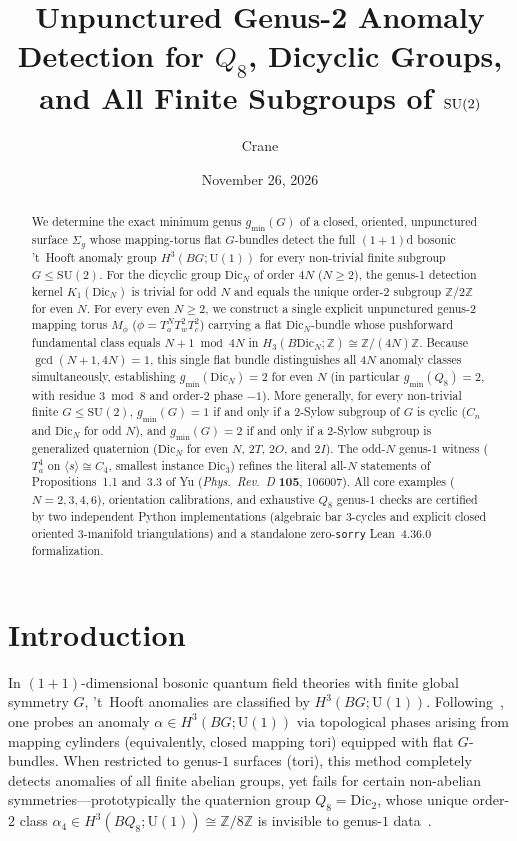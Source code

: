 \documentclass[11pt]{amsart}
\title[Unpunctured Genus-2 Anomaly Detection for Finite Subgroups of $\SU(2)$]{Unpunctured Genus-2 Anomaly Detection for $Q_8$, Dicyclic Groups, and All Finite Subgroups of $\SU(2)$}
\author{Crane}
\date{November 26, 2026}
\theoremstyle{definition}
\theoremstyle{remark}
\newcommand{\Z}{\mathbb{Z}}
\newcommand{\U}{\mathrm{U}}
\newcommand{\SU}{\mathrm{SU}}
\newcommand{\Dic}{\mathrm{Dic}}
\begin{document}
\begin{abstract}
We determine the exact minimum genus $g_{\min}(G)$ of a closed, oriented, unpunctured surface $\Sigma_g$ whose mapping-torus flat $G$-bundles detect the full $(1+1)$d bosonic 't~Hooft anomaly group $H^3(BG;\U(1))$ for every non-trivial finite subgroup $G \le \SU(2)$.
For the dicyclic group $\Dic_N$ of order $4N$ ($N \ge 2$), the genus-1 detection kernel $K_1(\Dic_N)$ is trivial for odd $N$ and equals the unique order-$2$ subgroup $\Z/2\Z$ for even $N$.
For every even $N \ge 2$, we construct a single explicit unpunctured genus-$2$ mapping torus $M_\phi$ ($\phi = T_a^N T_w^2 T_c^2$) carrying a flat $\Dic_N$-bundle whose pushforward fundamental class equals $N+1 \bmod 4N$ in $H_3(B\Dic_N;\Z) \cong \Z/(4N)\Z$.
Because $\gcd(N+1,4N)=1$, this single flat bundle distinguishes all $4N$ anomaly classes simultaneously, establishing $g_{\min}(\Dic_N)=2$ for even $N$ (in particular $g_{\min}(Q_8)=2$, with residue $3 \bmod 8$ and order-$2$ phase $-1$).
More generally, for every non-trivial finite $G \le \SU(2)$, $g_{\min}(G)=1$ if and only if a $2$-Sylow subgroup of $G$ is cyclic ($C_n$ and $\Dic_N$ for odd $N$), and $g_{\min}(G)=2$ if and only if a $2$-Sylow subgroup is generalized quaternion ($\Dic_N$ for even $N$, $2T$, $2O$, and $2I$).
The odd-$N$ genus-$1$ witness ($T_a^4$ on $\langle s\rangle \cong C_4$, smallest instance $\Dic_3$) refines the literal all-$N$ statements of Propositions~1.1 and~3.3 of Yu (\emph{Phys.\ Rev.\ D} \textbf{105}, 106007).
All core examples ($N=2,3,4,6$), orientation calibrations, and exhaustive $Q_8$ genus-$1$ checks are certified by two independent Python implementations (algebraic bar $3$-cycles and explicit closed oriented $3$-manifold triangulations) and a standalone zero-\texttt{sorry} Lean~4.36.0 formalization.
\end{abstract}

\maketitle

\section{Introduction}

In $(1+1)$-dimensional bosonic quantum field theories with finite global symmetry $G$, 't~Hooft anomalies are classified by $H^3(BG;\U(1))$.
Following~\cite{Yu2022}, one probes an anomaly $\alpha \in H^3(BG;\U(1))$ via topological phases arising from mapping cylinders (equivalently, closed mapping tori) equipped with flat $G$-bundles.
When restricted to genus-$1$ surfaces (tori), this method completely detects anomalies of all finite abelian groups, yet fails for certain non-abelian symmetries---prototypically the quaternion group $Q_8 = \Dic_2$, whose unique order-$2$ class $\alpha_4 \in H^3(BQ_8;\U(1)) \cong \Z/8\Z$ is invisible to genus-$1$ data~\cite{Yu2022}.
\end{document}
